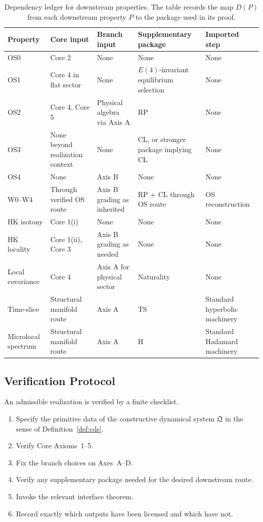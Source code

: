 \documentclass[12pt,a4paper]{article}
\theoremstyle{plain}
\theoremstyle{definition}
\theoremstyle{remark}
\begin{document}
\begin{table}[ht]
\centering
\renewcommand{\arraystretch}{1.2}
\begin{tabular}{@{}p{2.2cm}p{3.0cm}p{2.4cm}p{2.7cm}p{2.6cm}@{}}
\toprule
Property & Core input & Branch input & Supplementary package & Imported step \\
\midrule
OS0 & Core 2 & None & None & None \\
OS1 & Core 4 in flat sector & None & \(E(4)\)-invariant equilibrium selection & None \\
OS2 & Core 4, Core 5 & Physical algebra via Axis A & RP & None \\
OS3 & None beyond realization context & None & CL, or stronger package implying CL & None \\
OS4 & None & Axis B & None & None \\
W0--W4 & Through verified OS route & Axis B grading as inherited & RP + CL through OS route & OS reconstruction \\
HK isotony & Core 1(i) & None & None & None \\
HK locality & Core 1(ii), Core 3 & Axis B grading as needed & None & None \\
Local covariance & Core 4 & Axis A for physical sector & Naturality & None \\
Time-slice & Structural manifold route & Axis A & TS & Standard hyperbolic machinery \\
Microlocal spectrum & Structural manifold route & Axis A & H & Standard Hadamard machinery \\
\bottomrule
\end{tabular}
\caption{Dependency ledger for downstream properties. The table records
  the map \(D(P)\) from each downstream property \(P\) to the package
  used in its proof.}
\label{tab:dependency-ledger}
\end{table}

\subsection{Verification Protocol}

An admissible realization is verified by a finite checklist.

\begin{enumerate}
\item Specify the primitive data of the constructive dynamical system
  \(\mathfrak{Q}\) in the sense of Definition~\ref{def:cds}.
\item Verify Core Axioms~1--5.
\item Fix the branch choices on Axes~A--D.
\item Verify any supplementary package needed for the desired
  downstream route.
\item Invoke the relevant interface theorem.
\item Record exactly which outputs have been licensed and which have
  not.
\end{enumerate}
\end{document}
